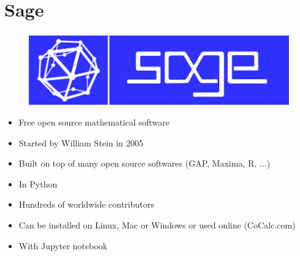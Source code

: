 \documentclass[10pt]{beamer}
\newcommand{\blue}[1]{{\color[rgb]{0,0.4,1}{#1}}}
\begin{document}
\section{Sage}

\begin{frame}\frametitle{\blue{SageMath}}

\vspace{-.8cm}

\begin{figure}[h]
	\raggedleft
	\includegraphics[scale=.25]{logo.png}
\end{figure}

\vspace{1cm}

\begin{itemize}
	\item Free open source mathematical software
	\item Started by William Stein in 2005
	\item Built on top of many open source softwares (GAP, Maxima, R, ...)
	\item In Python 
	\item Hundreds of worldwide contributors
	\item Can be installed on Linux, Mac or Windows or used online (CoCalc.com)
	\item With Jupyter notebook 
\end{itemize}


\end{frame}
\end{document}
